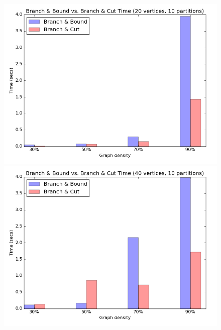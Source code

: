 \begin{figure}[h]
  \centering
  \begin{minipage}[b]{0.49\textwidth}
    \includegraphics[width=\textwidth]{img/1-bb_vs_bc_v20_p10_i1_co0_l40_t1_b0.png}
  \end{minipage}
  \hfill
  \begin{minipage}[b]{0.49\textwidth}
    \includegraphics[width=\textwidth]{img/1-bb_vs_bc_v40_p10_i1_co0_l40_t1_b0.png}
  \end{minipage}
  \begin{minipage}[b]{0.49\textwidth}

\end{minipage}
\end{figure}
